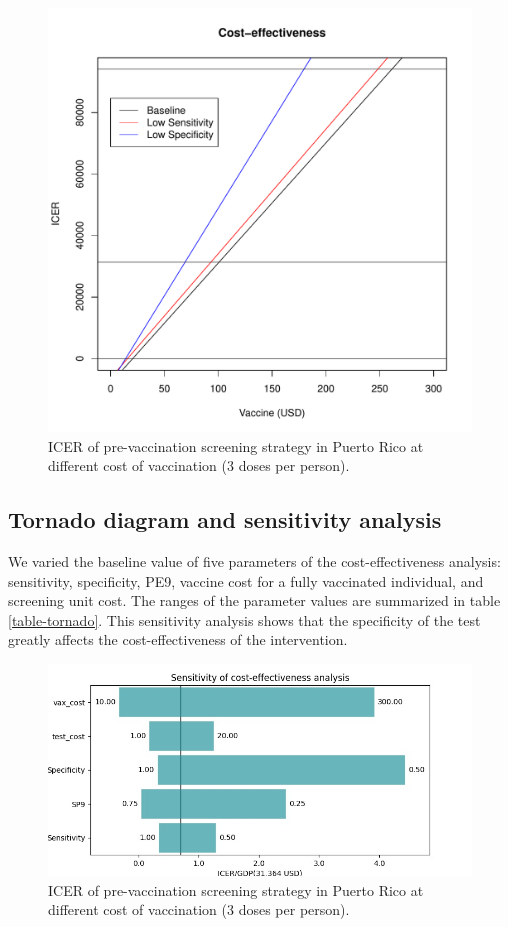 \documentclass[12pt]{article}\usepackage[]{graphicx}\usepackage[]{color}
\newenvironment{knitrout}{}{} %
\begin{document}
\begin{figure}[H]
  \centering
\begin{knitrout}
\color{fgcolor}

{\centering \includegraphics[width=9.5 cm]{figure/unnamed-chunk-1-1} 

}



\end{knitrout}
  \caption{ICER of pre-vaccination screening strategy in Puerto Rico at different cost of vaccination (3 doses per person).}
  \label{fig-ICER}
\end{figure}

\subsection{Tornado diagram and sensitivity analysis}
We varied the baseline value of five parameters of the cost-effectiveness analysis: sensitivity, specificity, PE9, vaccine cost for a fully vaccinated individual, and screening unit cost. The ranges of the parameter values are summarized in table \ref{table-tornado}. This sensitivity analysis shows that the specificity of the test greatly affects the cost-effectiveness of the intervention. 

\begin{figure}[H]
  \centering \includegraphics[width=.8\linewidth]{../analysis/figures/report_figure_tornado_diagram.jpeg}
  \caption{ICER of pre-vaccination screening strategy in Puerto Rico at different cost of vaccination (3 doses per person).}
  \label{fig-tornado}
\end{figure}
\end{document}
